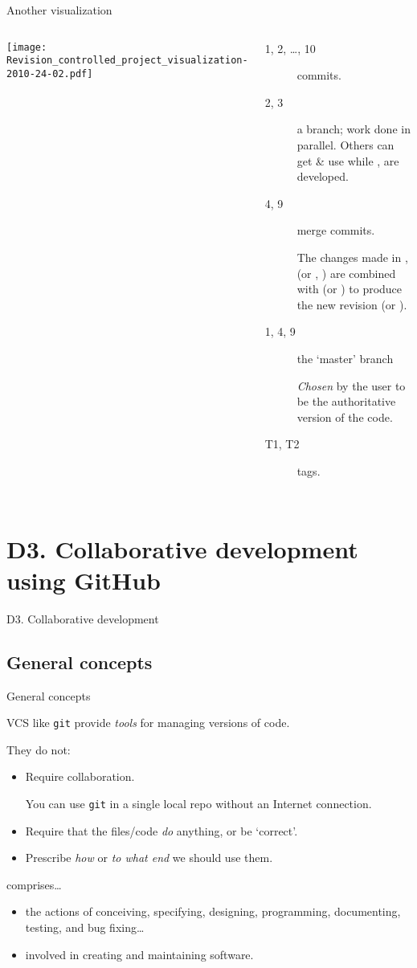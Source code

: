 \documentclass[12pt,aspectratio=169]{beamer}
\begin{document}
\begin{frame}{Another visualization}
\begin{columns}[T]
\texttt{[image: Revision\_controlled\_project\_visualization-2010-24-02.pdf]}

\begin{description}
  \item [1, 2, …, 10] commits.
  \item [2, 3] a branch; work done in parallel.
    Others can get \& use  while ,  are developed.
  \item [4, 9] merge commits.

    The changes made in ,  (or , ) are combined with  (or ) to produce the new revision  (or ).
  \item [1, 4, 9] the ‘master’ branch

    \emph{Chosen} by the user to be the authoritative version of the code.
  \item [T1, T2] tags.
\end{description}

\end{columns}
\end{frame}

\section{D3. Collaborative development using GitHub}
\begin{frame}{D3. Collaborative development}
\tableofcontents[hideothersubsections]
\end{frame}

\subsection{General concepts}
\begin{frame}{General concepts}

VCS like \texttt{git} provide \emph{tools} for managing versions of code.

\bigskip
They do not:
\begin{itemize}
  \item Require collaboration.

    You can use \texttt{git} in a single local repo without an Internet connection.
  \item Require that the files/code \emph{do} anything, or be ‘correct’.
  \item Prescribe \emph{how} or \emph{to what end} we should use them.
\end{itemize}

\bigskip
{} comprises…
\begin{itemize}
  \item the actions of conceiving, specifying, designing, programming, documenting, testing, and bug fixing…
  \item involved in creating and maintaining software.
\end{itemize}
\end{frame}
\end{document}
